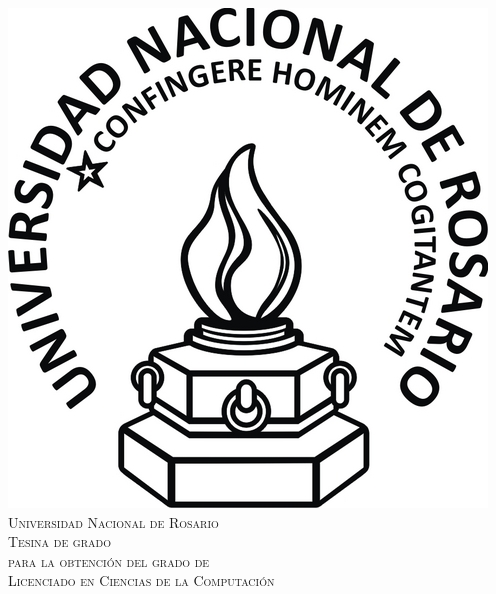 {%
\thispagestyle{empty}
\begin{center}
    \includegraphics[bb=0 0 100 100]{figures/UNR-escudo-1.jpg}
    \\[0.5cm]
    \textsc{\LARGE Universidad Nacional de Rosario}\\[1.5cm]

    \textsc{{\Large Tesina de grado} \\ para la obtenci\'on del grado de \\
     Licenciado en Ciencias de la Computaci\'on}\\[0.5cm]
    \HRule \\[0.4cm] %
        {\huge {} \\[0.4cm]}


\end{center}}
